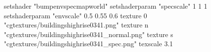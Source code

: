 setshader "bumpenvspecmapworld"
setshaderparam "specscale" 1 1 1
setshaderparam "envscale"  0.5 0.55 0.6
    texture 0 "cgtextures/buildingshighrise0341.png"
    texture n "cgtextures/buildingshighrise0341_normal.png"
    texture s "cgtextures/buildingshighrise0341_spec.png"
    texscale 3.1